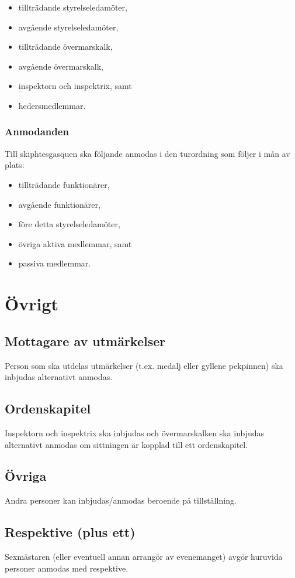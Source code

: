 \documentclass{dsekprotokoll}
\begin{document}
\begin{itemize}
    \item tillträdande styrelseledamöter,
    \item avgående styrelseledamöter,
    \item tillträdande övermarskalk,
    \item avgående övermarskalk,
    \item inspektorn och inspektrix, samt
    \item hedersmedlemmar.
\end{itemize}

\subsubsection{Anmodanden}

Till skiphtesgasquen ska följande anmodas i den turordning som följer i mån av plats:
  \begin{itemize}
    \item tillträdande funktionärer,
    \item avgående funktionärer,
    \item före detta styrelseledamöter,
    \item övriga aktiva medlemmar, samt
    \item passiva medlemmar.
  \end{itemize}


\section{Övrigt}

\subsection{Mottagare av utmärkelser}
Person som ska utdelas utmärkelser (t.ex. medalj eller gyllene pekpinnen) ska inbjudas alternativt anmodas.

\subsection{Ordenskapitel}
Inspektorn och inspektrix ska inbjudas och övermarskalken
ska inbjudas alternativt anmodas om sittningen är kopplad
till ett ordenskapitel.

\subsection{Övriga}
Andra personer kan inbjudas/anmodas beroende på tillställning.

\subsection{Respektive (plus ett)}
Sexmästaren (eller eventuell annan arrangör av evenemanget) avgör huruvida personer anmodas med respektive.
\end{document}
